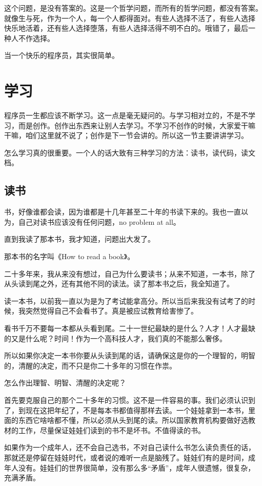 \documentclass[10pt]{article}
\begin{document}
\begin{CJK*}{UTF8}{simsun}
这个问题，是没有答案的。这是一个哲学问题，而所有的哲学问题，都没有答案。
就像生与死，作为一个人，每一个人都得面对。有些人选择不活了，有些人选择
快乐地活着，还有些人选择堕落，有些人选择活得不明不白的。哦错了，最后一
种人不作选择。

当一个快乐的程序员，其实很简单。

\section{学习}

程序员一生都应该不断学习。这一点是毫无疑问的。与学习相对立的，不是不学
习，而是创作。创作出东西来让别人去学习。不学习不创作的时候，大家爱干嘛
干嘛，咱们这里就不说了；创作是下一节会讲的。所以这一节主要讲讲学习。

怎么学习真的很重要。一个人的话大致有三种学习的方法：读书，读代码，读文
档。

\subsection{读书}

书，好像谁都会读，因为谁都是十几年甚至二十年的书读下来的。我也一直以
为，自己对读书应该没有任何问题，no problem at all。

直到我读了那本书，我才知道，问题出大发了。

那本书的名字叫《How to read a book》。

二十多年来，我从来没有想过，自己为什么要读书；从来不知道，一本书，除了
从头读到尾之外，还有其他不同的读法。读了那本书之后，我全知道了。

读一本书，以前我一直以为是为了考试能拿高分。所以当后来我没有试考了的时
候，我突然觉得自己不会看书了。真是被应试教育给害惨了。

看书千万不要每一本都从头看到尾。二十一世纪最缺的是什么？人才！人才最缺
的又是什么呢？时间！作为一个高科技人才，我们真的不能那么奢侈。

所以如果你决定一本书你要从头读到尾的话，请确保这是你的一个理智的，明智
的，清醒的决定，而不只是你二十多年的习惯在作祟。

怎么作出理智、明智、清醒的决定呢？

首先要克服自己的那个二十多年的习惯。这不是一件容易的事。我们必须认识到
了，到现在这把年纪了，不是每本书都值得那样去读。一个娃娃拿到一本书，里
面的东西它啥啥都不懂，所以必须从头到尾的读。所以国家教育机构要做好选教
材的工作，尽量保证娃娃们读到的书不是坏书。不值得读的书。

如果作为一个成年人，还不会自己选书，不对自己读什么书怎么读负责任的话，
那就还是停留在娃娃时代，或者说的难听一点是脑残了。娃娃们有的是时间，成
年人没有。娃娃们的世界很简单，没有那么多“矛盾”，成年人很遗憾，很复杂，
充满矛盾。


\end{CJK*}
\end{document}
